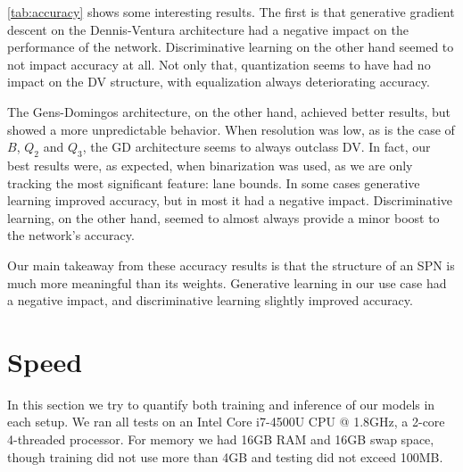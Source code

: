 \autoref{tab:accuracy} shows some interesting results. The first is that generative gradient
descent on the Dennis-Ventura architecture had a negative impact on the performance of
the network. Discriminative learning on the other hand seemed to not impact accuracy at all. Not
only that, quantization seems to have had no impact on the DV structure, with equalization always
deteriorating accuracy.

The Gens-Domingos architecture, on the other hand, achieved better results, but showed a more
unpredictable behavior. When resolution was low, as is the case of $B$, $Q_2$ and $Q_3$, the GD
architecture seems to always outclass DV. In fact, our best results were, as expected, when
binarization was used, as we are only tracking the most significant feature: lane bounds. In some
cases generative learning improved accuracy, but in most it had a negative impact.  Discriminative
learning, on the other hand, seemed to almost always provide a minor boost to the network's
accuracy.

Our main takeaway from these accuracy results is that the structure of an SPN is much more
meaningful than its weights. Generative learning in our use case had a negative impact, and
discriminative learning slightly improved accuracy.

\section{Speed}

In this section we try to quantify both training and inference of our models in each setup. We ran
all tests on an Intel Core i7-4500U CPU @ 1.8GHz, a 2-core 4-threaded processor. For memory we had
16GB RAM and 16GB swap space, though training did not use more than 4GB and testing did not exceed
100MB.

